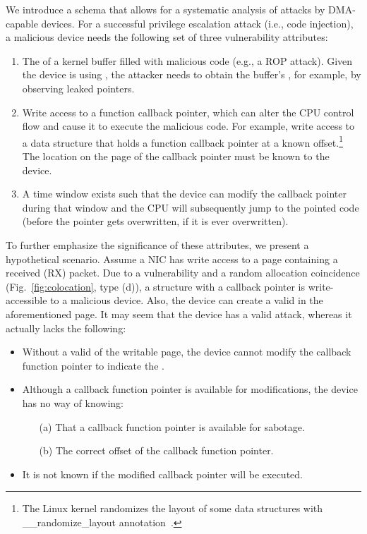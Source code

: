 We introduce a schema that allows for a systematic analysis of \DIFdelbegin {}\DIFdelend \DIFaddbegin {}\DIFaddend attacks by DMA-capable devices.
For a successful privilege escalation attack (i.e., code injection), a malicious device needs the following set of three vulnerability attributes:
\begin{enumerate}
    \item The \kva{} of a kernel buffer filled with malicious code (e.g., a ROP attack). Given the device is using \DIFaddbegin {}\DIFaddend \iova, the attacker needs to obtain the buffer's \kva{}, for example, by observing leaked pointers. 
    \item Write access to a function callback pointer, which can alter the CPU control flow and cause it to execute the malicious code. For example, write access to a data structure that holds a function callback pointer at a known offset.\footnote{The Linux kernel randomizes the layout of some data structures with \_\_randomize\_layout annotation~\cite{rand_layout}.} The location on the page of the callback pointer must be known to the device.
    \item A time window exists such that the device can modify the callback pointer during that window and the CPU will subsequently jump to the pointed code (before the pointer gets overwritten, if it is ever overwritten).
\end{enumerate}

To further emphasize the significance of these attributes, we present a hypothetical scenario. Assume a NIC has write access to a page containing a received (RX) packet. Due to a \subpage{} vulnerability and a random allocation coincidence (Fig.~\ref{fig:colocation}, type (d)), a structure with a callback pointer is write-accessible to a malicious device. Also, the device can create a valid \mabaf{} in the aforementioned page. It may seem that the device has a valid attack, whereas it actually lacks the following:

\begin{itemize}
    \item Without a valid \kva{} of the writable page, the device cannot modify the callback function pointer to indicate the \mabaf.
    \item Although a callback function pointer is available for modifications, the device has no way of knowing: 
    \begin{enumerate}
        \item[(a)] That a callback function pointer is available for sabotage.
        \item[(b)] The correct offset of the callback function pointer.
    \end{enumerate}
    \item It is not known if the modified callback pointer will be executed.
\end{itemize}

